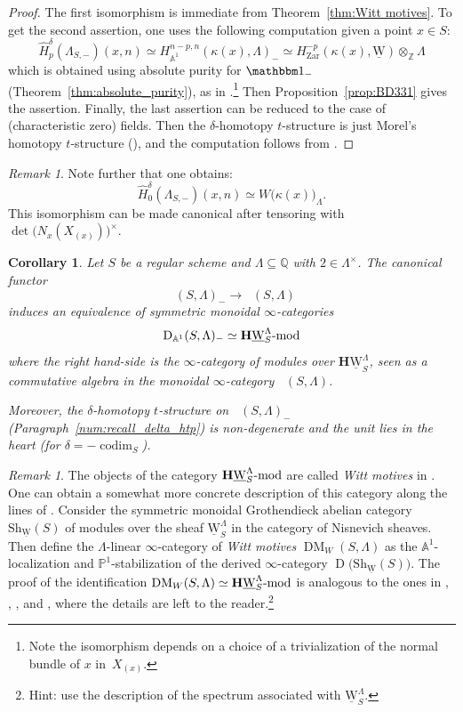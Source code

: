 \documentclass[JEP,XML,SOM,Unicode]{cedram}
\newcommand{\tstructure}{$t$-structure\xspace}
\newcommand{\modl}[1]{#1\textnormal{-}\mathrm{mod}}
\renewcommand{\AA}{\mathbb A}
\newcommand{\un}{\mathbbm 1}
\newcommand{\uW}{\underline{\mathrm W}}
\newcommand{\HuW}{\mathbf H \underline{\mathrm W}}
\DeclareMathOperator{\codim}{codim}
\DeclareMathOperator{\DM}{DM}
\DeclareMathOperator{\DA}{D_{\AA^1}}
\DeclareMathOperator{\Der}{D}
\newcommand{\ZZ} {\mathbb Z}
\newcommand{\QQ} {\mathbb Q}
\newcommand{\PP} {\mathbb P}
\newcommand{\zar}{\mathrm{Zar}}
\newtheorem{cor}[thm]{Corollary}
\theoremstyle{remark}
\newtheorem{rem}[thm]{Remark}
\theoremstyle{definition}
\numberwithin{equation}{thm}
\begin{document}
\begin{proof}
The first isomorphism is immediate from Theorem~\ref{thm:Witt motives}. To get the second assertion, one uses the following computation
given a point $x \in S$:
\[
\hat H_p^\delta(\Lambda_{S,-})(x,n) \simeq H^{n-p,n}_{\AA^1}(\kappa(x),\Lambda)_-
\simeq H^{-p}_\zar(\kappa(x),\uW) \otimes_\ZZ \Lambda
\]
which is obtained using absolute purity for $\un_-$ (Theorem~\ref{thm:absolute_purity}),
as in \cite[Ex.\,3.2.8]{BD1}.\footnote{Note the isomorphism depends on a choice
of a trivialization of the normal bundle of $x$ in~$X_{(x)}$.}
Then Proposition~\ref{prop:BD331} gives the assertion.
Finally, the last assertion can be reduced to the case of (characteristic zero)
fields. Then the $\delta$-homotopy \tstructure is just Morel's homotopy \tstructure
(\cite[Ex.\,2.3.5(2)]{BD1}), and the computation follows from \cite[Th.\,1, Rem.\,1]{ALP}.
\end{proof}

\begin{rem}
Note further that one obtains:
\[\hat H_0^\delta(\Lambda_{S,-})(x,n) \simeq W\big(\kappa(x)\big)_\Lambda.\]
This isomorphism
can be made canonical after tensoring with $\det\big(N_x(X_{(x)})\big)^\times$.
\end{rem}

\begin{cor}\label{cor:minus_DA&Witt_modl}
Let $S$ be a regular scheme and $\Lambda \subseteq \QQ$ with $2 \in \Lambda^\times$.
The canonical functor
\[
\DA(S,\Lambda)_- \to \DA(S,\Lambda)
\]
induces an equivalence of symmetric monoidal $\infty$-categories
\[
\DA(S,\Lambda)_- \simeq \modl{\HuW_S^\Lambda}
\]
where the right hand-side is the $\infty$-category of modules
over $\HuW_S^\Lambda$, seen as a commutative algebra in the
monoidal $\infty$-category $\DA(S,\Lambda)$.

Moreover, the $\delta$-homotopy \tstructure
on $\DA(S,\Lambda)_-$
(Paragraph~\ref{num:recall_delta_htp})
is non-degenerate and the unit lies in the heart
(for $\delta=-\codim_S$).
\end{cor}

\begin{rem}
The objects of the category $\modl{\HuW_S^\Lambda}$ are called \emph{Witt motives}
in \cite[\S 4]{ALP}. One can obtain a somewhat more concrete description
of this category along the lines of \cite{ALP}.
Consider the symmetric monoidal Grothendieck abelian category
$\mathrm{Sh}_{\uW}(S)$ of modules over the sheaf $\uW_S^\Lambda$ in the category of Nisnevich sheaves.
Then define the $\Lambda$-linear $\infty$-category of \emph{Witt motives}
$\DM_W(S,\Lambda)$ as the $\AA^1$\nobreakdash-localization and $\PP^1$-stabilization of the derived $\infty$-category $\Der\big(\mathrm{Sh}_{\uW}(S)\big)$.
The proof of the identification $\DM_W(S,\Lambda) \simeq \modl{\HuW_S^\Lambda}$ is analogous to the ones in \cite{RO}, \cite{CD5}, \cite{BachmannFasel}, \cite{EHKSY3} and \cite{ElmantoKolderup}, where the details are left to the reader.\footnote{Hint: use the description of the spectrum associated with $\uW_S^\Lambda$.}
\end{rem}
\end{document}
